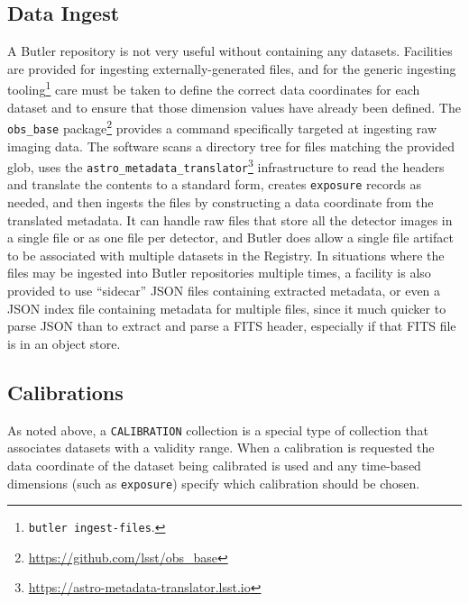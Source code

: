 \documentclass[]{spie}
\begin{document}
\subsection{Data Ingest}

A Butler repository is not very useful without containing any datasets.
Facilities are provided for ingesting externally-generated files, and for the generic ingesting tooling\footnote{\texttt{butler ingest-files}.} care must be taken to define the correct data coordinates for each dataset and to ensure that those dimension values have already been defined.
The \texttt{obs\_base} package\footnote{\url{https://github.com/lsst/obs_base}} provides a command specifically targeted at ingesting raw imaging data.
The software scans a directory tree for files matching the provided glob, uses the \texttt{astro\_metadata\_translator}\footnote{\url{https://astro-metadata-translator.lsst.io}} infrastructure to read the headers and translate the contents to a standard form, creates \texttt{exposure} records as needed, and then ingests the files by constructing a data coordinate from the translated metadata.
It can handle raw files that store all the detector images in a single file or as one file per detector, and Butler does allow a single file artifact to be associated with multiple datasets in the Registry.
In situations where the files may be ingested into Butler repositories multiple times, a facility is also provided to use ``sidecar'' JSON files containing extracted metadata, or even a JSON index file containing metadata for multiple files, since it much quicker to parse JSON than to extract and parse a FITS header, especially if that FITS file is in an object store.

\subsection{Calibrations}

As noted above, a \texttt{CALIBRATION} collection is a special type of collection that associates datasets with a validity range.
When a calibration is requested the data coordinate of the dataset being calibrated is used and any time-based dimensions (such as \texttt{exposure}) specify which calibration should be chosen.
\end{document}
